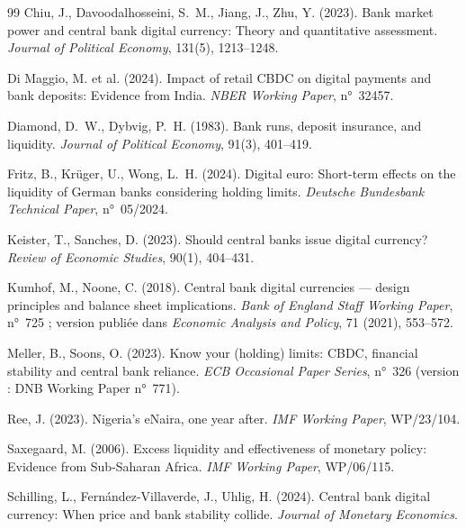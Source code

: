 \documentclass[11pt,a4paper]{article}
\begin{document}
\begin{thebibliography}{99}
		Chiu, J., Davoodalhosseini, S.~M., Jiang, J., Zhu, Y. (2023).
		\newblock Bank market power and central bank digital currency: Theory and quantitative assessment.
		\newblock \emph{Journal of Political Economy}, 131(5), 1213--1248.
		
		Di Maggio, M. et al. (2024).
		\newblock Impact of retail CBDC on digital payments and bank deposits: Evidence from India.
		\newblock \emph{NBER Working Paper}, n°~32457.
		
		Diamond, D.~W., Dybvig, P.~H. (1983).
		\newblock Bank runs, deposit insurance, and liquidity.
		\newblock \emph{Journal of Political Economy}, 91(3), 401--419.
		
		Fritz, B., Krüger, U., Wong, L.~H. (2024).
		\newblock Digital euro: Short-term effects on the liquidity of German banks considering holding limits.
		\newblock \emph{Deutsche Bundesbank Technical Paper}, n°~05/2024.
		
		Keister, T., Sanches, D. (2023).
		\newblock Should central banks issue digital currency?
		\newblock \emph{Review of Economic Studies}, 90(1), 404--431.
		
		Kumhof, M., Noone, C. (2018).
		\newblock Central bank digital currencies --- design principles and balance sheet implications.
		\newblock \emph{Bank of England Staff Working Paper}, n°~725 ; version publiée dans \emph{Economic Analysis and Policy}, 71 (2021), 553--572.
		
		Meller, B., Soons, O. (2023).
		\newblock Know your (holding) limits: CBDC, financial stability and central bank reliance.
		\newblock \emph{ECB Occasional Paper Series}, n°~326 (version : DNB Working Paper n°~771).
		
		Ree, J. (2023).
		\newblock Nigeria's eNaira, one year after.
		\newblock \emph{IMF Working Paper}, WP/23/104.
		
		Saxegaard, M. (2006).
		\newblock Excess liquidity and effectiveness of monetary policy: Evidence from Sub-Saharan Africa.
		\newblock \emph{IMF Working Paper}, WP/06/115.
		
		Schilling, L., Fernández-Villaverde, J., Uhlig, H. (2024).
		\newblock Central bank digital currency: When price and bank stability collide.
		\newblock \emph{Journal of Monetary Economics}.
		

\end{thebibliography}
\end{document}

